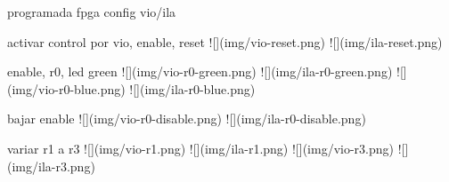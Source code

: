programada fpga config vio/ila

activar control por vio, enable, reset
![](img/vio-reset.png)
![](img/ila-reset.png)

enable, r0, led green
![](img/vio-r0-green.png)
![](img/ila-r0-green.png)
![](img/vio-r0-blue.png)
![](img/ila-r0-blue.png)

bajar enable
![](img/vio-r0-disable.png)
![](img/ila-r0-disable.png)

variar r1 a r3
![](img/vio-r1.png)
![](img/ila-r1.png)
![](img/vio-r3.png)
![](img/ila-r3.png)
